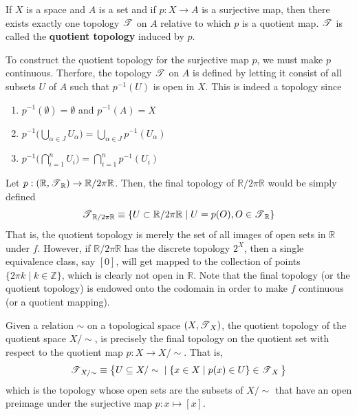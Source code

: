   \begin{definition}
    If $X$ is a space and $A$ is a set and if $p: X \rightarrow A$ is a surjective map, then there exists exactly one topology $\operatorname{\mathscr{T}}$ on $A$ relative to which $p$ is a quotient map. $\operatorname{\mathscr{T}}$ is called the \textbf{quotient topology} induced by $p$. 
  \end{definition}

  To construct the quotient topology for the surjective map $p$, we must make $p$ continuous. Therfore, the topology $\operatorname{\mathscr{T}}$ on $A$ is defined by letting it consist of all subsets $U$ of $A$ such that $p^{-1}(U)$ is open in $X$. This is indeed a topology since
  \begin{enumerate}
    \item $p^{-1} (\emptyset) = \emptyset$ and $p^{-1}(A) = X$
    \item $p^{-1} \Big( \bigcup_{\alpha \in J} U_\alpha \Big) = \bigcup_{\alpha \in J} p^{-1} (U_\alpha)$
    \item $p^{-1} \Big( \bigcap_{i=1}^n U_i \Big) = \bigcap_{i=1}^n p^{-1} (U_i)$
  \end{enumerate}

  \begin{example}
    Let $p: (\mathbb{R}, \operatorname{\mathscr{T}}_\mathbb{R}) \rightarrow \mathbb{R} / 2 \pi \mathbb{R}$. Then, the final topology of $\mathbb{R} / 2 \pi \mathbb{R}$ would be simply defined 
    \begin{equation}
      \operatorname{\mathscr{T}}_{\mathbb{R} / 2 \pi \mathbb{R}} \equiv \{U \subset \mathbb{R} / 2\pi \mathbb{R} \; | \; U = p(O), O \in \operatorname{\mathscr{T}}_\mathbb{R}\}
    \end{equation}
    That is, the quotient topology is merely the set of all images of open sets in $\mathbb{R}$ under $f$. However, if $\mathbb{R} / 2 \pi \mathbb{R}$ has the discrete topology $2^X$, then a single equivalence class, say $[0]$, will get mapped to the collection of points $\{2 \pi k \mid k \in \mathbb{Z}\}$, which is clearly not open in $\mathbb{R}$. Note that the final topology (or the quotient topology) is endowed onto the codomain in order to make $f$ continuous (or a quotient mapping). 
  \end{example}

  \begin{proposition}
    Given a relation $\sim$ on a topological space $(X, \operatorname{\mathscr{T}}_X)$, the quotient topology of the quotient space $X / \sim$, is precisely the final topology on the quotient set with respect to the quotient map $p: X \rightarrow X / \sim$. That is, 
    \begin{equation}
      \operatorname{\mathscr{T}}_{X / \sim} \equiv \big\{U \subseteq X / \sim \; | \; \{x \in X \; | \; p(x) \in U\} \in \operatorname{\mathscr{T}}_X \big\}
    \end{equation}
    which is the topology whose open sets are the subsets of $X / \sim$ that have an open preimage under the surjective map $p: x \mapsto [x]$. 
  \end{proposition}

